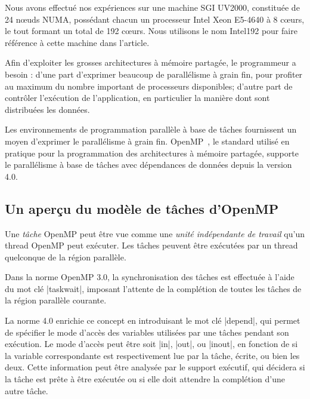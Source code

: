 \documentclass[parallelisme]{compas2016}
\begin{document}
\label{sec:background}

Nous avons effectué nos expériences sur une machine SGI UV2000, constituée de
24 nœuds NUMA, possédant chacun un processeur Intel Xeon E5-4640 à 8 cœurs,
le tout formant un total de 192 cœurs. Nous utilisons le nom Intel192 pour faire
référence à cette machine dans l'article.

Afin d'exploiter les grosses architectures à mémoire partagée, le programmeur a besoin :
d'une part d'exprimer beaucoup de parallélisme à grain fin, pour profiter au
maximum du nombre important de processeurs disponibles; d'autre part de contrôler
l'exécution de l'application, en particulier la manière dont sont distribuées
les données.

Les environnements de programmation parallèle à base de tâches fournissent un moyen
d'exprimer le parallélisme à grain fin. OpenMP~\cite{openmp40}, le standard utilisé
en pratique pour la programmation des architectures à mémoire partagée, supporte
le parallélisme à base de tâches avec dépendances de données depuis la version 4.0.

\subsection{Un aperçu du modèle de tâches d'OpenMP}

Une \emph{tâche} OpenMP peut être vue comme une \emph{unité indépendante de travail} qu'un thread
OpenMP peut exécuter. Les tâches peuvent être exécutées par un thread quelconque
de la région parallèle.

Dans la norme OpenMP 3.0, la synchronisation des tâches est effectuée à l'aide du
mot clé |taskwait|, imposant l'attente de la complétion de toutes les tâches
de la région parallèle courante.

La norme 4.0 enrichie ce concept en introduisant le mot clé |depend|, qui permet
de spécifier le mode d'accès des variables utilisées par une tâches pendant son exécution.
Le mode d'accès peut être soit |in|, |out|, ou |inout|, en fonction de si la
variable correspondante est respectivement lue par la tâche, écrite, ou bien les deux.
Cette information peut être analysée par le support exécutif, qui décidera si
la tâche est prête à être exécutée ou si elle doit attendre la complétion d'une
autre tâche.


\end{document}
